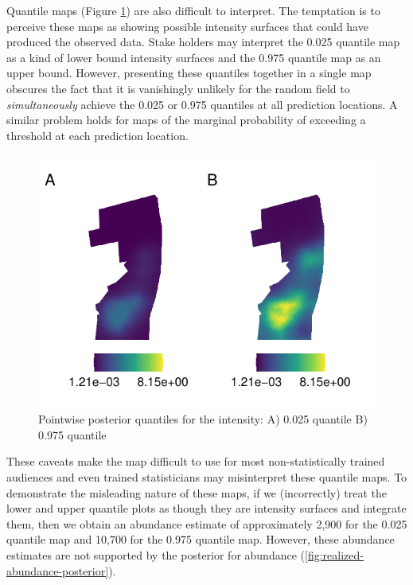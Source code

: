 \documentclass{statsoc}
\begin{document}
Quantile maps (Figure \ref{fig:intensity-quantiles}) are also difficult to interpret. The temptation is to perceive these maps as showing possible intensity surfaces that could have produced the observed data.  Stake holders may interpret the 0.025 quantile map as a kind of lower bound intensity surfaces and the 0.975 quantile map as an upper bound. However, presenting these quantiles together in a single map obscures the fact that it is vanishingly unlikely for the random field to \textit{simultaneously} achieve the 0.025 or 0.975 quantiles at all prediction locations.  A similar problem holds for maps of the marginal probability of exceeding a threshold at each prediction location. 
\begin{figure}[!htb]
	\begin{center}
		\includegraphics{figures/intensity_quantiles.pdf}
		\caption{Pointwise posterior quantiles for the intensity:  A) 0.025 quantile B) 0.975 quantile}
		\label{fig:intensity-quantiles}
	\end{center}
\end{figure}
These caveats make the map difficult to use for most non-statistically trained audiences and even trained statisticians may misinterpret these quantile maps.  To demonstrate the misleading nature of these maps, if we (incorrectly) treat the lower and upper quantile plots as though they are intensity surfaces and integrate them, then we obtain an abundance estimate of approximately 2,900 for the 0.025 quantile map and 10,700 for the 0.975 quantile map.  However, these abundance estimates are not supported by the posterior for abundance (\autoref{fig:realized-abundance-posterior}).
\end{document}
